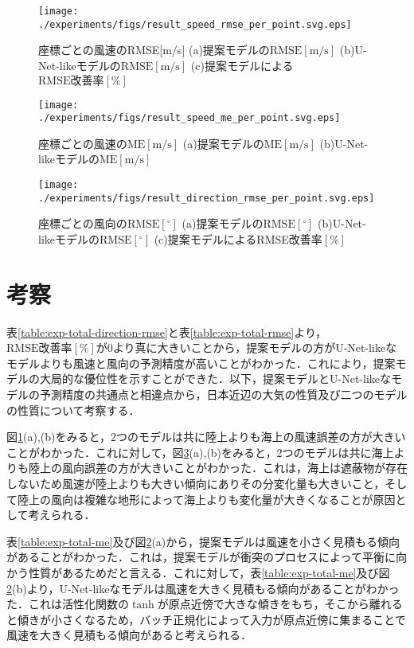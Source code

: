 \begin{figure}[bp]
  \centering
  \texttt{[image: ./experiments/figs/result\_speed\_rmse\_per\_point.svg.eps]}
  \caption{座標ごとの風速のRMSE[m/s] (a)提案モデルの$\mathrm{RMSE[m/s]}$ (b)U-Net-likeモデルの$\mathrm{RMSE[m/s]}$ (c)提案モデルによる$\mathrm{RMSE改善率[\%]}$}
  \label{fig:exp-speed-rmse-per-point}
\end{figure}

\begin{figure}[bp]
  \centering
  \texttt{[image: ./experiments/figs/result\_speed\_me\_per\_point.svg.eps]}
  \caption{座標ごとの風速の$\mathrm{ME[m/s]}$ (a)提案モデルの$\mathrm{ME[m/s]}$ (b)U-Net-likeモデルの$\mathrm{ME[m/s]}$}
  \label{fig:exp-speed-ma-per-point}
\end{figure}

\begin{figure}[bp]
  \centering
  \texttt{[image: ./experiments/figs/result\_direction\_rmse\_per\_point.svg.eps]}
  \caption{座標ごとの風向の$\mathrm{RMSE[^\circ]}$ (a)提案モデルの$\mathrm{RMSE[^\circ]}$ (b)U-Net-likeモデルの$\mathrm{RMSE[^\circ]}$ (c)提案モデルによるRMSE改善率$\mathrm{[\%]}$}
  \label{fig:exp-direction-rmse-per-point}
\end{figure}

\section{考察 \label{section:exp-discussion}}
表\ref{table:exp-total-direction-rmse}と表\ref{table:exp-total-rmse}より，$\mathrm{RMSE改善率[\%]}$が0より真に大きいことから，提案モデルの方がU-Net-likeなモデルよりも風速と風向の予測精度が高いことがわかった．これにより，提案モデルの大局的な優位性を示すことができた．以下，提案モデルとU-Net-likeなモデルの予測精度の共通点と相違点から，日本近辺の大気の性質及び二つのモデルの性質について考察する．

図\ref{fig:exp-speed-rmse-per-point}(a),(b)をみると，2つのモデルは共に陸上よりも海上の風速誤差の方が大きいことがわかった．これに対して，図\ref{fig:exp-direction-rmse-per-point}(a),(b)をみると，2つのモデルは共に海上よりも陸上の風向誤差の方が大きいことがわかった．これは，海上は遮蔽物が存在しないため風速が陸上よりも大きい傾向にありその分変化量も大きいこと，そして陸上の風向は複雑な地形によって海上よりも変化量が大きくなることが原因として考えられる．

表\ref{table:exp-total-me}及び図\ref{fig:exp-speed-ma-per-point}(a)から，提案モデルは風速を小さく見積もる傾向があることがわかった．これは，提案モデルが衝突のプロセスによって平衡に向かう性質があるためだと言える．これに対して，表\ref{table:exp-total-me}及び図\ref{fig:exp-speed-ma-per-point}(b)より，U-Net-likeなモデルは風速を大きく見積もる傾向があることがわかった．これは活性化関数の$\tanh$が原点近傍で大きな傾きをもち，そこから離れると傾きが小さくなるため，バッチ正規化によって入力が原点近傍に集まることで風速を大きく見積もる傾向があると考えられる．

